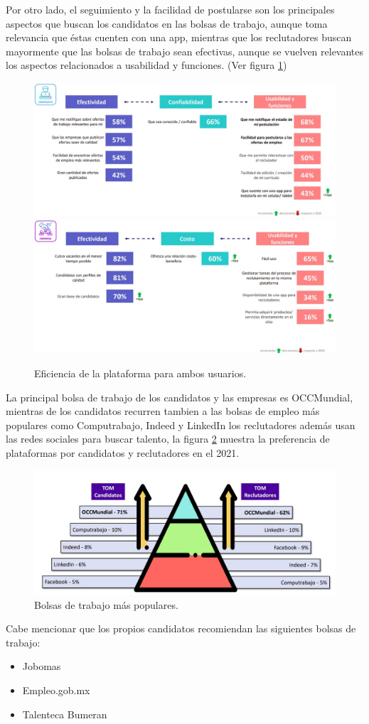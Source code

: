     Por otro lado, el seguimiento y la facilidad de postularse son los principales aspectos que buscan los candidatos en las bolsas 
    de trabajo, aunque toma relevancia que éstas cuenten con una app, mientras que los reclutadores buscan mayormente que las bolsas 
    de trabajo sean efectivas, aunque se vuelven relevantes los aspectos relacionados a usabilidad y funciones. (Ver figura \ref{mark:efi})
    \begin{figure}[H]
        \begin{center}
            \includegraphics[width=.6\textwidth]{antecedentes/imagenes/prefC.jpeg}
            \includegraphics[width=.6\textwidth]{antecedentes/imagenes/prefE.jpeg}
        \end{center}
        \caption{Eficiencia de la plataforma para ambos usuarios.}
        \label{mark:efi}
    \end{figure}

    La principal bolsa de trabajo  de los candidatos y las empresas es OCCMundial, mientras de los candidatos recurren tambien a las 
bolsas de empleo más populares como Computrabajo, Indeed y LinkedIn los reclutadores además usan las redes sociales para buscar talento, la
figura \ref{mark:med} muestra la preferencia de plataformas por candidatos y reclutadores en el 2021.
\begin{figure}[H]
    \begin{center}
        \includegraphics[width=.7\textwidth]{antecedentes/imagenes/topbdt.jpeg}
    \end{center}
    \caption{Bolsas de trabajo más populares.}
    \label{mark:med}
\end{figure}


Cabe mencionar que los propios candidatos recomiendan las siguientes bolsas de trabajo:
\begin{itemize}
    \item Jobomas
    \item Empleo.gob.mx 
    \item Talenteca Bumeran
\end{itemize}



    
